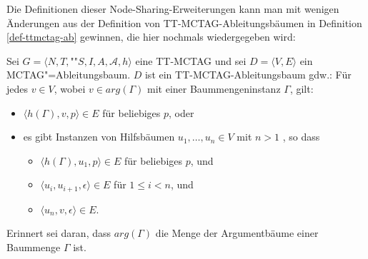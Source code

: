 Die Definitionen dieser Node-Sharing-Erweiterungen kann man mit wenigen Änderungen aus der Definition von TT-MCTAG-Ableitungsbäumen in Definition \ref{def-ttmctag-ab} gewinnen, die hier nochmals wiedergegeben wird:  
\begin{definition}
Sei $G = \langle N,T,$""$S,I,A,\mathcal{A},h \rangle$ eine TT-MCTAG und sei $D=\langle V,E \rangle$ ein MCTAG"=Ableitungsbaum. \linebreak $D$ ist ein TT-MCTAG-Ablei\-tungs\-baum gdw.:
Für jedes $v \in V$, wobei $v \in arg(\Gamma)$ mit einer Baummengeninstanz $\Gamma$, gilt:
\begin{itemize} 
  \item $\langle h(\Gamma),v,p \rangle \in E$ für beliebiges $p$, oder
  \item es gibt Instanzen von Hilfsbäumen $u_1, \ldots, u_n \in V$ mit $n>1$ , so dass
  \begin{itemize}
    \item $\langle h(\Gamma),u_1,p \rangle \in E$ für beliebiges $p$, und
    \item $\langle u_i,u_{i+1},\epsilon \rangle \in E$ für $1 \leq i < n$, und
    \item $\langle u_n,v,\epsilon \rangle \in E$.
  \end{itemize}
\end{itemize}  
\end{definition}
Erinnert sei daran, dass $arg(\Gamma)$ die Menge der Argumentbäume einer Baummenge $\Gamma$ ist.

